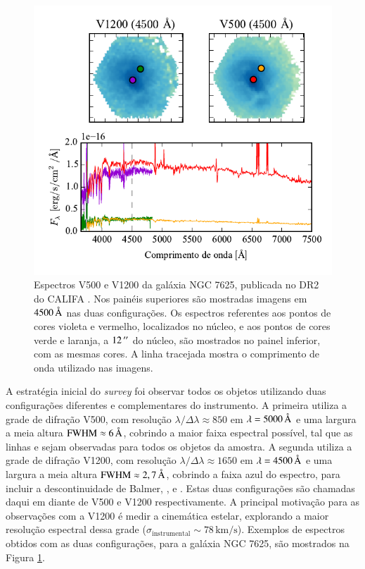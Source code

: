 \begin{figure}
	\includegraphics{figuras/DR2_sample_spectra}
	\caption[Exemplos de espectros V500 e V1200 do CALIFA]
	{Espectros V500 e V1200 da galáxia NGC 7625, publicada no DR2 do CALIFA
	\citep{GarciaBenito2015}. Nos painéis superiores são mostradas imagens em
	$4500\,\text{\normalfont\AA}$ nas duas configurações. Os espectros referentes aos pontos
	de cores violeta e vermelho, localizados no núcleo, e aos pontos de cores
	verde e laranja, a $12\,^{\prime\prime}$ do núcleo, são mostrados no painel inferior,
	com as mesmas cores. A linha tracejada mostra o comprimento de onda utilizado
	nas imagens.}
	\label{fig:DR2ExampleSpectra}
\end{figure}

A estratégia inicial do {\em survey} foi observar todos os objetos utilizando
duas configurações diferentes e complementares do instrumento. A primeira
utiliza a grade de difração V500, com resolução $\lambda / \Delta\lambda \approx
850$ em $\lambda = 5000\,\text{\normalfont\AA}$ e uma largura a meia altura $\mathrm{FWHM}
\approx 6\,\text{\normalfont\AA}$, cobrindo a maior faixa espectral possível, tal que as
linhas \OII e \SII sejam observadas para todos os objetos da amostra.
A segunda utiliza a grade de difração V1200, com resolução $\lambda /
\Delta\lambda \approx 1650$ em $\lambda = 4500\,\text{\normalfont\AA}$ e uma largura a meia
altura $\mathrm{FWHM} \approx 2,7\,\text{\normalfont\AA}$, cobrindo a faixa azul do
espectro, para incluir a descontinuidade de Balmer, \Hdelta, \Hgamma e
.
Estas duas configurações são chamadas daqui em diante de V500 e V1200
respectivamente. A principal motivação para as observações com a V1200 é medir a
cinemática estelar, explorando a maior resolução espectral dessa grade
($\sigma_{\mathrm{instrumental}} \sim 78\, \mathrm{km}/\mathrm{s}$). Exemplos de
espectros obtidos com as duas configurações, para a galáxia NGC 7625, são
mostrados na Figura \ref{fig:DR2ExampleSpectra}.


